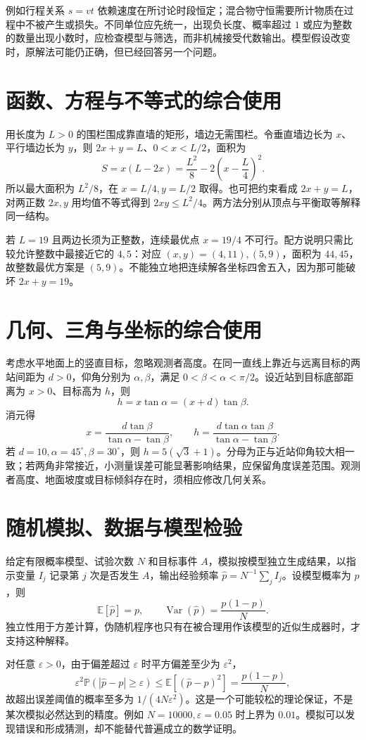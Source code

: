 \documentclass[UTF8]{ctexbook}
\begin{document}
例如行程关系 $s=vt$ 依赖速度在所讨论时段恒定；混合物守恒需要所计物质在过程中不被产生或损失。不同单位应先统一，出现负长度、概率超过 $1$ 或应为整数的数量出现小数时，应检查模型与筛选，而非机械接受代数输出。模型假设改变时，原解法可能仍正确，但已经回答另一个问题。

\section{函数、方程与不等式的综合使用}
用长度为 $L>0$ 的围栏围成靠直墙的矩形，墙边无需围栏。令垂直墙边长为 $x$、平行墙边长为 $y$，则 $2x+y=L$、$0<x<L/2$，面积为
\[
 S=x(L-2x)=\frac{L^2}{8}-2\left(x-\frac L4\right)^2.
\]
所以最大面积为 $L^2/8$，在 $x=L/4,y=L/2$ 取得。也可把约束看成 $2x+y=L$，对两正数 $2x,y$ 用均值不等式得到 $2xy\le L^2/4$。两方法分别从顶点与平衡取等解释同一结构。

若 $L=19$ 且两边长须为正整数，连续最优点 $x=19/4$ 不可行。配方说明只需比较允许整数中最接近它的 $4,5$：对应 $(x,y)=(4,11),(5,9)$，面积为 $44,45$，故整数最优方案是 $(5,9)$。不能独立地把连续解各坐标四舍五入，因为那可能破坏 $2x+y=19$。

\section{几何、三角与坐标的综合使用}
考虑水平地面上的竖直目标，忽略观测者高度。在同一直线上靠近与远离目标的两站间距为 $d>0$，仰角分别为 $\alpha,\beta$，满足 $0<\beta<\alpha<\pi/2$。设近站到目标底部距离为 $x>0$、目标高为 $h$，则
\[
 h=x\tan\alpha=(x+d)\tan\beta.
\]
消元得
\[
 x=\frac{d\tan\beta}{\tan\alpha-\tan\beta},\qquad
 h=\frac{d\tan\alpha\tan\beta}{\tan\alpha-\tan\beta}.
\]
若 $d=10,\alpha=45^\circ,\beta=30^\circ$，则 $h=5(\sqrt3+1)$。分母为正与近站仰角较大相一致；若两角非常接近，小测量误差可能显著影响结果，应保留角度误差范围。观测者高度、地面坡度或目标倾斜存在时，须相应修改几何关系。

\section{随机模拟、数据与模型检验}
给定有限概率模型、试验次数 $N$ 和目标事件 $A$，模拟按模型独立生成结果，以指示变量 $I_j$ 记录第 $j$ 次是否发生 $A$，输出经验频率 $\widehat p=N^{-1}\sum_j I_j$。设模型概率为 $p$，则
\[
 \mathbb E[\widehat p]=p,\qquad
 \operatorname{Var}(\widehat p)=\frac{p(1-p)}N.
\]
独立性用于方差计算，伪随机程序也只有在被合理用作该模型的近似生成器时，才支持这种解释。

对任意 $\varepsilon>0$，由于偏差超过 $\varepsilon$ 时平方偏差至少为 $\varepsilon^2$，
\[
 \varepsilon^2\mathbb P(|\widehat p-p|\ge\varepsilon)
 \le\mathbb E[(\widehat p-p)^2]
 =\frac{p(1-p)}N,
\]
故超出误差阈值的概率至多为 $1/(4N\varepsilon^2)$。这是一个可能较松的理论保证，不是某次模拟必然达到的精度。例如 $N=10000,\varepsilon=0.05$ 时上界为 $0.01$。模拟可以发现错误和形成猜测，却不能替代普遍成立的数学证明。
\end{document}
